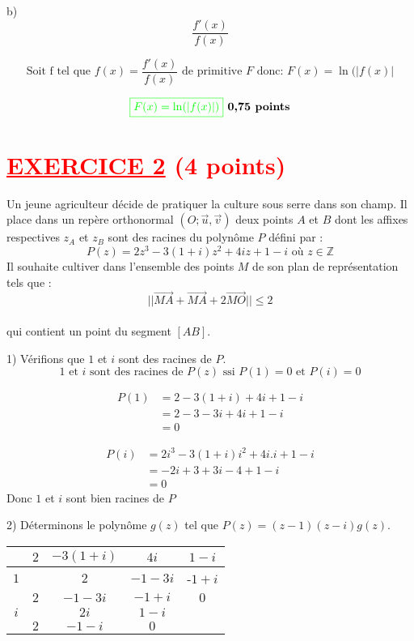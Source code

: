 \documentclass[12pt]{article}
\begin{document}
b)
\[
\frac{f'(x)}{f(x)}
\]

\[
\text{Soit f tel que }f(x)=\frac{f'(x)}{f(x)} \text{ de primitive } F \text{ donc: } F(x)=\ln(|f(x)|
\]

\[
\textcolor{green}{\boxed{ F(x)=\ln(|f(x)|) }} \textbf{ 0,75 points}
\]
\section*{\textcolor{red}{\underline{EXERCICE 2} (4 points) }}
Un jeune agriculteur décide de pratiquer la culture sous serre dans son champ. Il place dans un repère orthonormal \( (O; \vec{u}, \vec{v}) \) deux points \( A \) et \( B \) dont les affixes respectives \( z_A \) et \( z_B \) sont des racines du polynôme \( P \) défini par :
\[
P(z) = 2z^3 - 3(1+i)z^2 + 4iz + 1 - i \text{ où } z\in\mathbb{Z}
\]
Il souhaite cultiver dans l'ensemble des points \( M \) de son plan de représentation tels que :
\[
||\overrightarrow{MA} + \overrightarrow{MA} + 2\overrightarrow{MO}|| \leq 2
\]\\
qui contient un point du segment \( [AB] \).

1) Vérifions que \(1\) et \(i\) sont des racines de \(P\). \\
\[
\text{1 et $i$ sont des racines de $P(z)$ ssi  }P(1) = 0 \text{ et } P(i) = 0
\]

\begin{align*}
P(1) &= 2 - 3(1+i) + 4i + 1 - i\\
		&= 2 - 3-3i + 4i + 1 - i\\
		&=0
\end{align*}

\begin{align*}
P(i) &=2i^3 - 3(1+i)i^2 + 4i.i + 1 - i\\
		&=-2i + 3+3i - 4 + 1 - i\\
		&=0
\end{align*}
Donc \(1\) et \(i\) sont bien racines de $P$

2) Déterminons le polynôme \( g(z) \) tel que \( P(z) = (z-1)(z-i)g(z) \). \\

\begin{tabular}{|c|c|c|c|c|}
\hline
&$2$ & $-3(1+i)$ & $4i$ & $1-i$\\
\hline
$1$&&$2$&$-1-3i$&-$1+i$\\
\hline
&$2$&$-1-3i$&$-1+i$&$0$\\
\hline
$i$&&$2i$&$1-i$&\\
\hline
&$2$&$-1-i$&$0$&\\
\hline
\end{tabular}
\end{document}
